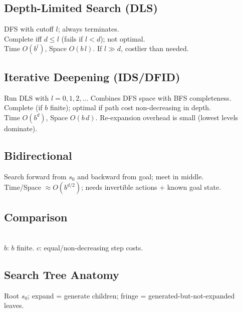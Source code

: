 \subsection*{Depth-Limited Search (DLS)}
DFS with cutoff \(l\); always terminates.\\
Complete iff \( d\le l \) (fails if \(l<d\)); not optimal.\\
Time \( O(b^l) \), Space \( O(b\,l) \). If \( l\gg d \), costlier than needed.

\subsection*{Iterative Deepening (IDS/DFID)}
Run DLS with \( l=0,1,2,\dots \) Combines DFS space with BFS completeness.\\
Complete (if \(b\) finite); optimal if path cost non-decreasing in depth.\\
Time \( O(b^d) \), Space \( O(b\,d) \). Re-expansion overhead is small (lowest levels dominate).

\subsection*{Bidirectional}
Search forward from \(s_0\) and backward from goal; meet in middle.\\
Time/Space \( \approx O(b^{d/2}) \); needs invertible actions + known goal state.

\subsection*{Comparison}
\\
\(b\): \(b\) finite. \(c\): equal/non-decreasing step costs.

\subsection*{Search Tree Anatomy}
Root \(s_0\); expand = generate children; fringe = generated-but-not-expanded leaves.
